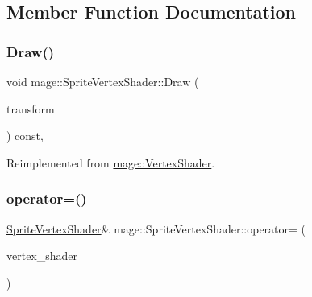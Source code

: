 \subsection{Member Function Documentation}
\hypertarget{classmage_1_1_sprite_vertex_shader_afbdc0824aca486a3f5d3750b9363d143}{}\label{classmage_1_1_sprite_vertex_shader_afbdc0824aca486a3f5d3750b9363d143} 
\subsubsection{\texorpdfstring{Draw()}{Draw()}}
{\footnotesize\ttfamily void mage\+::\+Sprite\+Vertex\+Shader\+::\+Draw (\begin{DoxyParamCaption}\item[{const X\+M\+M\+A\+T\+R\+IX \&}]{transform }\end{DoxyParamCaption}) const\hspace{0.3cm}{\ttfamily [override]}, {\ttfamily [virtual]}}



Reimplemented from \hyperlink{classmage_1_1_vertex_shader_a31475f1248dfb39519d8745a1fad6ca1}{mage\+::\+Vertex\+Shader}.

\hypertarget{classmage_1_1_sprite_vertex_shader_a4400ddda9637b280b7c8aedeeec6e4e7}{}\label{classmage_1_1_sprite_vertex_shader_a4400ddda9637b280b7c8aedeeec6e4e7} 
\subsubsection{\texorpdfstring{operator=()}{operator=()}\hspace{0.1cm}{\footnotesize\ttfamily [1/2]}}
{\footnotesize\ttfamily \hyperlink{classmage_1_1_sprite_vertex_shader}{Sprite\+Vertex\+Shader}\& mage\+::\+Sprite\+Vertex\+Shader\+::operator= (\begin{DoxyParamCaption}\item[{const \hyperlink{classmage_1_1_sprite_vertex_shader}{Sprite\+Vertex\+Shader} \&}]{vertex\+\_\+shader }\end{DoxyParamCaption})\hspace{0.3cm}{\ttfamily [delete]}}

\hypertarget{classmage_1_1_sprite_vertex_shader_aac64cf5df2b118ba95be72aef2bd3dca}{}\label{classmage_1_1_sprite_vertex_shader_aac64cf5df2b118ba95be72aef2bd3dca} 
